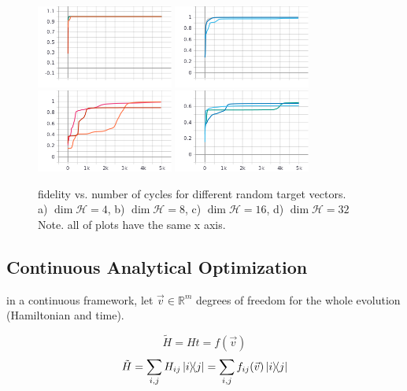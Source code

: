 \documentclass{article}
\begin{document}
\begin{figure}[H]
\centering
\includegraphics[width=0.4\textwidth]{fidelity_4}
\includegraphics[width=0.4\textwidth]{fidelity_8} \\
\includegraphics[width=0.4\textwidth]{fidelity_16}
\includegraphics[width=0.4\textwidth]{fidelity_32}
\caption{fidelity vs. number of cycles for different random target vectors. 
\\ a) $\dim \mathcal{H} = 4$, b) $\dim \mathcal{H} = 8$, c) $\dim \mathcal{H} = 16$, d) $\dim \mathcal{H} = 32$
\\ Note. all of plots have the same x axis.}
\end{figure}

\subsection{Continuous Analytical Optimization}
in a continuous framework, let $\vec{v} \in \mathbb{R}^m$ degrees of freedom for the whole evolution (Hamiltonian and time).

\[ \tilde{H} = Ht = f(\vec{v}) \]
\[ \tilde{H} = \sum_{i, j} H_{ij} \dyad{i}{j} = \sum_{i, j} f_{ij}(\vec{v}) \dyad{i}{j} \]
\end{document}
